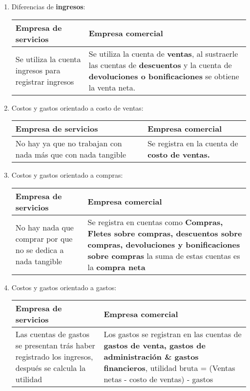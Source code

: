 \documentclass{article}
\begin{document}
\begin{enumerate}

    \item Diferencias de \textbf{ingresos}:
    \begin{center}
    \begin{tabular}{ | p{5cm} | p{9cm} | }
     \hline
     Empresa de servicios & Empresa comercial\\
     \hline
     Se utiliza la cuenta ingresos para registrar ingresos & Se utiliza la cuenta de \textbf{ventas}, al sustraerle las cuentas de \textbf{descuentos} y la cuenta de \textbf{devoluciones o bonificaciones} se obtiene la venta neta. \\ 
     \hline
    \end{tabular}
    \end{center}


    \item Costos y gastos orientado a costo de ventas:
    \begin{center}
    \begin{tabular}{ | p{5cm} | p{9cm} | }
     \hline
     Empresa de servicios & Empresa comercial\\
     \hline
    No hay ya que no trabajan con nada más que con nada tangible & Se registra en la cuenta de \textbf{costo de ventas.}\\ 

     \hline
    \end{tabular}
    \end{center}
    
    
    
    \item Costos y gastos orientado a compras:
    \begin{center}
    \begin{tabular}{ | p{5cm} | p{9cm} | }
    \hline
    Empresa de servicios & Empresa comercial\\
    \hline
    No hay nada que comprar por que no se dedica a nada tangible  & Se registra en cuentas como \textbf{Compras, Fletes sobre compras, descuentos sobre compras, devoluciones y bonificaciones sobre compras} la suma de estas cuentas es la \textbf{compra neta} \\ 
    \hline
    \end{tabular}
    \end{center}                                                                                
    
    
    
    \item Costos y gastos orientado a gastos:
    \begin{center}
    \begin{tabular}{ | p{5cm} | p{9cm} | }
    \hline
    Empresa de servicios & Empresa comercial\\
    \hline
    Las cuentas de gastos se presentan trás haber registrado los ingresos, después se calcula la utilidad & Los gastos se registran en las cuentas de \textbf{gastos de venta, gastos de administración \& gastos financieros}, \newline  utilidad bruta = (Ventas netas - costo de ventas) - gastos \\ 


\end{tabular}
\end{center}
\end{enumerate}
\end{document}
